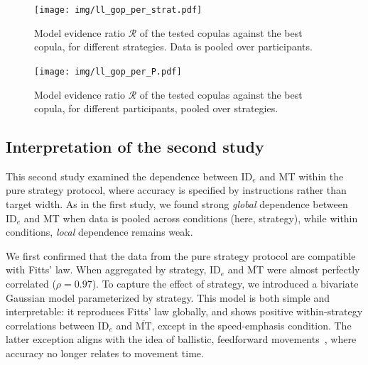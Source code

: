 \documentclass[acmlarge, manuscript,review]{acmart}
\newcommand{\mmt}{\ensuremath{\overline{\mt}}\xspace}
\newcommand{\mt}{\ensuremath{{\text{MT}}}\xspace}
\newcommand{\ide}{\ensuremath{{\text{ID}_e}}\xspace}
\begin{document}
\begin{figure}[htbp]
	\centering
		\texttt{[image: img/ll\_gop\_per\_strat.pdf]}
	\caption{Model evidence ratio $\mathcal{R}$ of the tested copulas against the best copula, for different strategies. Data is pooled over participants.}
	\label{fig:r_cop_gop_s}
\end{figure}




\begin{figure}[htbp]
	\centering
		\texttt{[image: img/ll\_gop\_per\_P.pdf]}
	\caption{Model evidence ratio $\mathcal{R}$ of the tested copulas against the best copula, for different participants, pooled over strategies.}
	\label{fig:ll_cop_gop_p}
\end{figure}


\subsection{Interpretation of the second study}
This second study examined the dependence between \ide and MT within the pure strategy protocol, where accuracy is specified by instructions rather than target width. 
As in the first study, we found strong \textit{global} dependence between \ide and MT when data is pooled across conditions (here, strategy), while within conditions, \textit{local} dependence remains weak.



We first confirmed that the data from the pure strategy protocol are compatible with Fitts' law. When aggregated by strategy, \ide and \mmt were almost perfectly correlated ($\rho = 0.97$). To capture the effect of strategy, we introduced a bivariate Gaussian model parameterized by strategy. This model is both simple and interpretable: it reproduces Fitts' law globally, and shows positive within-strategy correlations between \ide and \mmt, except in the speed-emphasis condition. The latter exception aligns with the idea of ballistic, feedforward movements~\cite{gan1988,crossman1957}, where accuracy no longer relates to movement time.
\end{document}
